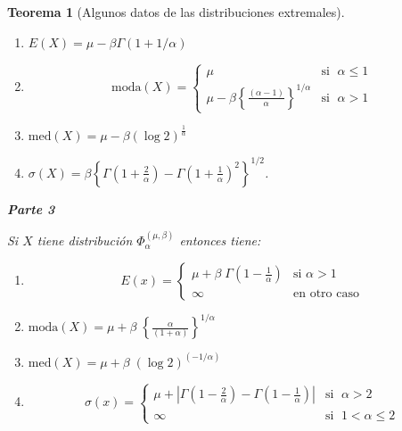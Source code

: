 \documentclass[
  20pt,
]{book}
\newtheorem{theorem}{Teorema}[chapter]
\theoremstyle{definition}
\theoremstyle{definition}
\theoremstyle{definition}
\theoremstyle{definition}
\theoremstyle{remark}
\begin{document}
\begin{theorem}[Algunos datos de las distribuciones extremales]
\begin{enumerate}
\def\labelenumi{\alph{enumi})}
\item
  \(E(X)=\mu -\beta \Gamma (1+1/\alpha)\)
\item
  \begin{equation*}\text{moda}(X) =\begin{cases} 
    \mu  & \text{si }\; \alpha \leq 1 \\
   \mu-\beta\left\{ \frac{\left( \alpha-1 \right)}{\alpha} \right\}^{1/\alpha} & \text{si }\; \alpha >1
  \end{cases}\end{equation*}
\item
  \(\text{med}(X)=\mu - \beta (\log 2)^{\frac{1}{\alpha}}\)
\item
  \(\sigma(X)=\beta\left\{\Gamma\left( 1+\frac{2}{\alpha} \right)-\Gamma\left( 1+\frac{1}{\alpha} \right)^2  \right\}^{1/2}\).
\end{enumerate}

\textbf{Parte 3}

Si \(X\) tiene distribución \(\Phi_{\alpha}^{(\mu, \beta)}\) entonces tiene:

\begin{enumerate}
\def\labelenumi{\alph{enumi})}
\item
  \begin{equation*}
  E(x) =
  \begin{cases} 
   \mu + \beta\;\Gamma\left( 1-\frac{1}{\alpha} \right) & \text{si } \alpha>1 \\
   \infty & \text{en otro caso}
  \end{cases}
  \end{equation*}
\item
  \(\text{moda}(X)=\mu+ \beta\;\left\{ \frac{\alpha}{\left( 1+ \alpha\right)}\right\}^{1/\alpha}\)
\item
  \(\text{med}(X)=\mu + \beta \;\left( \log 2 \right)^{\left( -1/\alpha \right)}\)
\item
  \begin{equation*}
  \sigma(x) =
  \begin{cases} 
   \mu + \left| \Gamma \left( 1 - \frac{2}{\alpha} \right) - \Gamma \left(  1 - \frac{1}{\alpha}\right)\right|  & \text{si } \; \alpha>2 \\
   \infty & \text{si } \; 1<\alpha \leq 2
  \end{cases}
  \end{equation*}
\end{enumerate}

\end{theorem}
\end{document}
